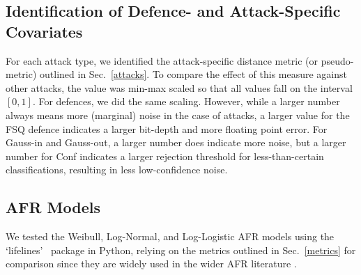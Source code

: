 \begin{itemize}
\end{itemize}




\subsection{Identification of Defence- and Attack-Specific Covariates}
For each attack type, we identified the attack-specific distance metric (or pseudo-metric) outlined in Sec.~\ref{attacks}. To compare the effect of this measure against other attacks, the value was min-max scaled so that all values fall on the interval $[0,1]$. For defences, we did the same scaling. However, while a larger number always means more (marginal) noise in the case of attacks, a larger value for the FSQ defence indicates a larger bit-depth and more floating point error. For Gauss-in and Gauss-out, a larger number does indicate more noise, but a larger number for Conf indicates a larger rejection threshold for less-than-certain classifications, resulting in less low-confidence noise. 


\subsection{AFR Models}
We tested the Weibull, Log-Normal, and Log-Logistic AFR models using the `lifelines'~\citep{lifelines} package in Python, relying on the metrics outlined in Sec.~\ref{metrics} for comparison since they are widely used in the wider AFR literature \citep{aft_models}.
